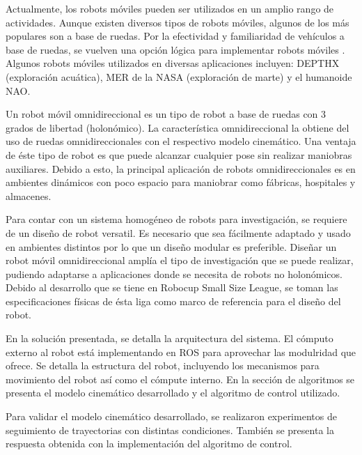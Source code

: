 \documentclass[twocolumn,10pt]{amrob}
\begin{document}
Actualmente, los robots móviles pueden ser utilizados en un amplio rango de actividades. Aunque existen diversos tipos de robots móviles, algunos de los más populares son a base de ruedas. Por la efectividad y familiaridad de vehículos a base de ruedas, se vuelven una opción lógica para implementar robots móviles \cite{corke2011robotics}. Algunos robots móviles utilizados en diversas aplicaciones incluyen: DEPTHX (exploración acuática), MER de la NASA (exploración de marte) y el humanoide NAO. \par 
Un robot móvil omnidireccional es un tipo de robot a base de ruedas con 3 grados de libertad (holonómico). La característica omnidireccional la obtiene del uso de ruedas omnidireccionales con el respectivo modelo cinemático. Una ventaja de éste tipo de robot es que puede alcanzar cualquier pose sin realizar maniobras auxiliares. Debido a esto, la principal aplicación de robots omnidireccionales es en ambientes dinámicos con poco espacio para maniobrar como fábricas, hospitales y almacenes. \par
Para contar con un sistema homogéneo de robots para investigación, se requiere de un diseño de robot versatil. Es necesario que sea fácilmente adaptado y usado en ambientes distintos por lo que un diseño modular es preferible. Diseñar un robot móvil omnidireccional amplía el tipo de investigación que se puede realizar, pudiendo adaptarse a aplicaciones donde se necesita de robots no holonómicos. Debido al desarrollo que se tiene en Robocup Small Size League, se toman las especificaciones físicas de ésta liga como marco de referencia para el diseño del robot. \par
En la solución presentada, se detalla la arquitectura del sistema. El cómputo externo al robot está implementando en ROS para aprovechar las modulridad que ofrece. Se detalla la estructura del robot, incluyendo los mecanismos para movimiento del robot así como el cómpute interno. En la sección de algoritmos se presenta el modelo cinemático desarrollado y el algoritmo de control utilizado. \par
Para validar el modelo cinemático desarrollado, se realizaron experimentos de seguimiento de trayectorias con distintas condiciones. También se presenta la respuesta obtenida con la implementación del algoritmo de control. \par

\end{document}
